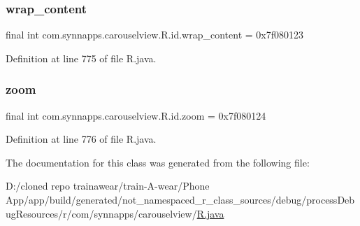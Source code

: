 \subsubsection{\texorpdfstring{wrap\_content}{wrap\_content}}
{\footnotesize\ttfamily final int com.\+synnapps.\+carouselview.\+R.\+id.\+wrap\+\_\+content = 0x7f080123\hspace{0.3cm}{\ttfamily [static]}}



Definition at line 775 of file R.\+java.

\mbox{\label{classcom_1_1synnapps_1_1carouselview_1_1_r_1_1id_af872f48dda88ab7bc9941b95fce004ae}} 
\subsubsection{\texorpdfstring{zoom}{zoom}}
{\footnotesize\ttfamily final int com.\+synnapps.\+carouselview.\+R.\+id.\+zoom = 0x7f080124\hspace{0.3cm}{\ttfamily [static]}}



Definition at line 776 of file R.\+java.



The documentation for this class was generated from the following file\+:\begin{DoxyCompactItemize}
\item 
D\+:/cloned repo trainawear/train-\/\+A-\/wear/\+Phone App/app/build/generated/not\+\_\+namespaced\+\_\+r\+\_\+class\+\_\+sources/debug/process\+Debug\+Resources/r/com/synnapps/carouselview/\mbox{\hyperlink{process_debug_resources_2r_2com_2synnapps_2carouselview_2_r_8java}{R.\+java}}\end{DoxyCompactItemize}
